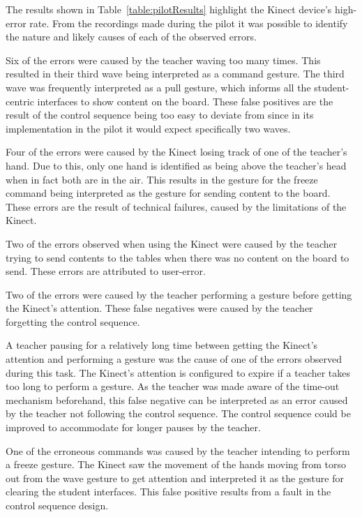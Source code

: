 \documentclass[link]{IWCOMP}
\begin{document}
The results shown in Table~\ref{table:pilotResults} highlight the Kinect device's high-error rate.
From the recordings made during the pilot it was possible to identify the nature and likely causes of each of the observed errors.

Six of the errors were caused by the teacher waving too many times.
This resulted in their third wave being interpreted as a command gesture.
The third wave was frequently interpreted as a pull gesture, which informs all the student-centric interfaces to show content on the board.
These false positives are the result of the control sequence being too easy to deviate from since in its implementation in the pilot it would expect specifically two waves.

Four of the errors were caused by the Kinect losing track of one of the teacher's hand.
Due to this, only one hand is identified as being above the teacher's head when in fact both are in the air.
This results in the gesture for the freeze command being interpreted as the gesture for sending content to the board.
These errors are the result of technical failures, caused by the limitations of the Kinect.

Two of the errors observed when using the Kinect were caused by the teacher trying to send contents to the tables when there was no content on the board to send.
These errors are attributed to user-error.

Two of the errors were caused by the teacher performing a gesture before getting the Kinect's attention.
These false negatives were caused by the teacher forgetting the control sequence.

A teacher pausing for a relatively long time between getting the Kinect's attention and performing a gesture was the cause of one of the errors observed during this task.
The Kinect's attention is configured to expire if a teacher takes too long to perform a gesture.
As the teacher was made aware of the time-out mechanism beforehand, this false negative can be interpreted as an error caused by the teacher not following the control sequence.
The control sequence could be improved to accommodate for longer pauses by the teacher.

One of the erroneous commands was caused by the teacher intending to perform a freeze gesture.
The Kinect saw the movement of the hands moving from torso out from the wave gesture to get attention and interpreted it as the gesture for clearing the student interfaces.
This false positive results from a fault in the control sequence design.
\end{document}

